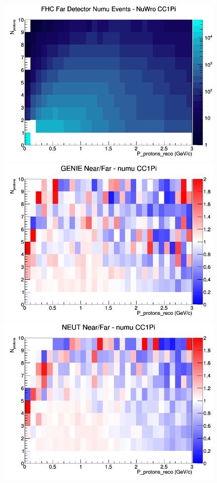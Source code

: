 \begin{figure}[h]
\endminipage
{}
\includegraphics[width=\linewidth]{eff_N_P/LAr/protons/CC1Pi_FHC_FD_numu_N_P_NuWro.png}
\endminipage
\newline
{}
\includegraphics[width=\linewidth]{eff_N_P/LAr/protons/ratios/CC1Pi_GENIE_numu_NF_N_P.png}
\endminipage
{}
\includegraphics[width=\linewidth]{eff_N_P/LAr/protons/ratios/CC1Pi_NEUT_numu_NF_N_P.png}

\end{figure}
